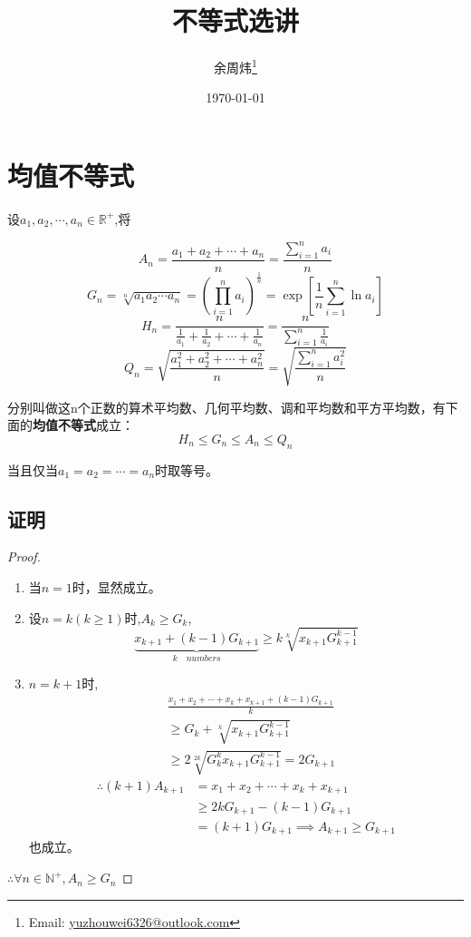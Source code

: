\documentclass[a4paper]{article} %
\title{\heiti 不等式选讲}
\author{\kaishu 余周炜\thanks{Email: \href{mailto:yuzhouwei6326@outlook.com}{yuzhouwei6326@outlook.com}}}
\date{\today}
\numberwithin{equation}{section} %
\begin{document}
\maketitle


\clearpage
\tableofcontents

\newpage
\section{均值不等式}

设$a_1,a_2,\cdots,a_n\in\mathbb{R^+}$,将

$$
A_n= \frac{a_1+a_2+\cdots+a_n}{n}=\frac{\sum_{i=1}^{n}a_i}{n} 
$$
$$
G_n= \sqrt[n]{a_1a_2\cdots a_n}=\left(\prod_{i=1}^n a_i\right)^{\frac{1}{n}}=\exp\left[\frac{1}{n}\sum_{i=1}^n\ln a_i\right]
$$
$$
H_n= \frac{n}{\frac{1}{a_1}+\frac{1}{a_2}+\cdots+\frac{1}{a_n}}=\frac{n}{\sum_{i=1}^{n}\frac{1}{a_i}}
$$
$$
Q_n= \sqrt{\frac{a_1^2+a_2^2+\cdots+a_n^2}{n}}=\sqrt{\frac{\sum_{i=1}^n a_i^2}{n}}
$$

分别叫做这n个正数的算术平均数、几何平均数、调和平均数和平方平均数，有下面的\textbf{均值不等式}成立：
\begin{equation}
H_n\le G_n \le A_n \le Q_n
\end{equation}

当且仅当$a_1=a_2=\cdots=a_n$时取等号。

\subsection{证明}

\begin{proof}
\begin{enumerate}
\item 当$n=1$时，显然成立。
\item 设$n=k(k\ge 1)$时,$A_k\ge G_k$,
$$
\underbrace{x_{k+1}+(k-1)G_{k+1}}_{k\quad  numbers}\ge k \sqrt[k]{x_{k+1}G_{k+1}^{k-1}}
$$
\item $n=k+1$时,
\begin{align*}
 &\frac{x_1+x_2+\cdots+x_k+x_{k+1}+(k-1)G_{k+1}}{k} \\
 &\ge G_k+\sqrt[k]{x_{k+1}G_{k+1}^{k-1}}  \\
& \ge 2\sqrt[2k]{G_{k}^{k}x_{k+1}G_{k+1}^{k-1}}=2G_{k+1}
\end{align*} 
\begin{align*}
\therefore (k+1)A_{k+1} &=x_1+x_2+\cdots+x_k+x_{k+1} \\
& \ge 2kG_{k+1}-(k-1)G_{k+1} \\
& =(k+1)G_{k+1} \implies A_{k+1}\ge G_{k+1}
\end{align*}
也成立。
\end{enumerate}

$\therefore \forall n\in\mathbb{N^+} ,A_n\ge G_n$
\end{proof}
\end{document}
